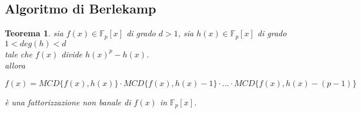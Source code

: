 \documentclass[a4paper,12pt]{article}
\theoremstyle{def}
\theoremstyle{prop}
\theoremstyle{esempio}
\theoremstyle{dimostrazione}
\theoremstyle{teo}
\newtheorem*{teorema}{Teorema}
\theoremstyle{osservazione}
\begin{document}
\newpage

\subsection{Algoritmo di Berlekamp}

\begin{teorema}
	sia \(f(x) \in \mathbb{F}_p[x]\) di grado \(d > 1\), sia \(h(x) \in \mathbb{F}_p[x]\) di grado \(1 < deg(h) < d\)\\
	tale che \(f(x)\) divide \(h(x)^p - h(x)\).\\
	allora
	\begin{center}
		\(f(x) = MCD\{f(x), h(x)\} \cdot MCD\{f(x), h(x) - 1\} \cdot ... \cdot MCD\{f(x), h(x) - (p - 1)\}\)
	\end{center}
	è una fattorizzazione non banale di \(f(x)\) in \(\mathbb{F}_p[x]\).
\end{teorema}
\end{document}
